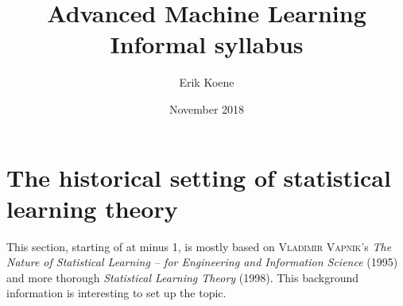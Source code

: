 \documentclass{article}
\title{\textbf{Advanced Machine  Learning}\\Informal syllabus}
\author{Erik Koene}
\date{November 2018}
\begin{document}
\maketitle

\setcounter{section}{-2}
\section{The historical setting of statistical learning theory}
This section, starting of at minus 1, is mostly based on \textsc{Vladimir Vapnik}'s \textit{The Nature of Statistical Learning -- for Engineering and Information Science} (1995) and more thorough \textit{Statistical Learning Theory} (1998). This background information is interesting to set up the topic.
\end{document}
